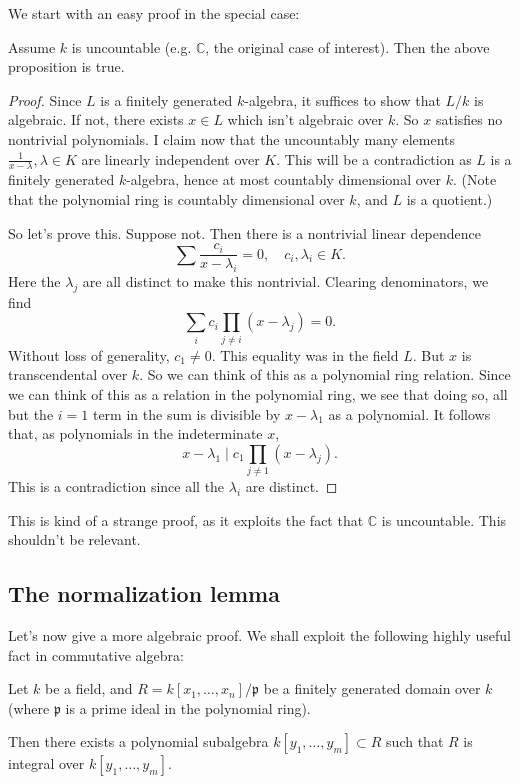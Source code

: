 We start with an easy proof in the special case:
\begin{lemma}
Assume $k$ is uncountable (e.g. $\mathbb{C}$, the original case of interest).
Then the above proposition is true.
\end{lemma}
\begin{proof}
Since $L$ is a finitely generated $k$-algebra, it suffices to show that $L/k$
is algebraic.
If not, there exists $x \in L$ which isn't algebraic over $k$. So $x$ satisfies
no nontrivial polynomials.
I claim now that the uncountably many elements $\frac{1}{x-\lambda}, \lambda
\in K$ are linearly
independent over $K$. This will be a contradiction as $L$ is a finitely
generated $k$-algebra, hence at most countably dimensional over $k$. (Note that
the polynomial ring is countably dimensional over $k$, and $L$ is a quotient.)

So let's prove this. Suppose not. Then there is a nontrivial linear dependence
\[ \sum \frac{c_i}{x - \lambda_i}  = 0, \quad c_i, \lambda_i \in K. \]
Here the $\lambda_j$ are all distinct to make this nontrivial. Clearing
denominators, we find
\[ \sum_i c_i \prod_{j \neq i } (x- \lambda_j) = 0. \]
Without loss of generality, $c_1 \neq 0$.
This equality was in the field $L$. But $x$ is transcendental over $k$. So we
can think of this as a polynomial ring relation.
Since we can think of this as a relation in the polynomial ring, we see that
doing so, all but the $i =1$ term in the sum is divisible by $x - \lambda_1$
as a polynomial.
It follows that, as polynomials in the indeterminate $x$,
\[ x - \lambda_1 \mid c_1 \prod_{j \neq 1} (x - \lambda_j).  \]
This is a contradiction since all the $\lambda_i$ are distinct.
\end{proof}

This is kind of a strange proof, as it exploits the fact that $\mathbb{C}$ is
uncountable.
This shouldn't be relevant.

\subsection{The normalization lemma}

Let's now give a more algebraic proof.
We shall exploit the following highly useful fact in commutative algebra:

\begin{theorem} Let $k$ be a field, and $R =
k[x_1, \dots, x_n]/\mathfrak{p}$ be a finitely generated domain over $k$ (where
$\mathfrak{p}$ is a prime ideal in the polynomial ring).

Then there exists a polynomial subalgebra $k[y_1, \dots, y_m] \subset R$ such
that $R$ is integral over $k[y_1, \dots, y_m]$.
\end{theorem}

